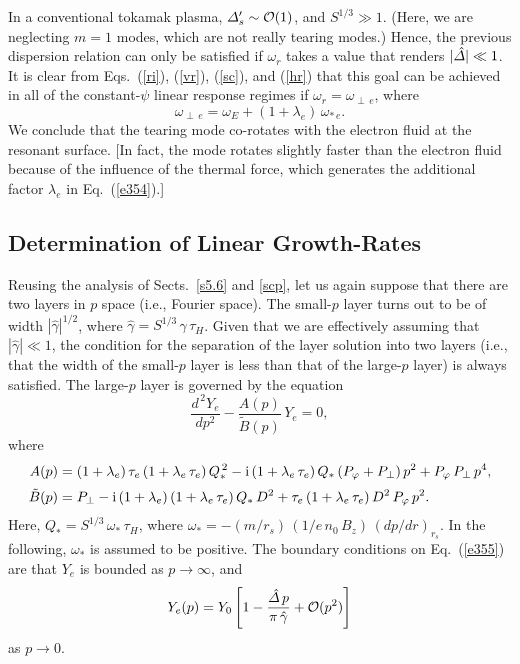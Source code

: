 \documentclass[12pt,prb,aps]{revtex4-1}
\begin{document}
In a conventional tokamak plasma, ${\mit\Delta}_s' \sim {\cal O}(1)$, and $S^{1/3}\gg 1$. (Here, we are neglecting $m=1$ modes, which
are not really tearing modes.)
Hence, the previous dispersion relation can only be satisfied if $\omega_r$ takes a
value that renders $|\hat{\mit\Delta}|\ll 1$. It is clear from Eqs.~(\ref{ri}), (\ref{vr}), (\ref{sc}), and (\ref{hr}) that this goal
can be achieved in all of the constant-$\psi$ linear response regimes if
$\omega_r = \omega_{\perp\,e}$, where
\begin{equation}\label{e354}
\omega_{\perp\,e} = \omega_E+(1+\lambda_e)\,\omega_{\ast\,e}.
\end{equation}
We conclude that the tearing mode co-rotates with the electron fluid at the resonant
 surface.\cite{ara} [In fact, the mode 
rotates slightly faster than the electron fluid because of the influence of the thermal force, 
which generates the additional  factor $\lambda_e$ in Eq.~(\ref{e354}).]

\subsection{Determination of Linear Growth-Rates}\label{s6.3}
Reusing the analysis of Sects.~\ref{s5.6} and \ref{scp}, let us again suppose that there are two layers in $p$ space (i.e., Fourier space). The
small-$p$ layer turns out to be of width $|\hat{\gamma}|^{1/2}$, where $\hat{\gamma} = S^{1/3}\,\gamma\,\tau_H$. Given that we are effectively assuming that
$|\hat{\gamma}|\ll 1$, the condition for the separation of the layer solution into two layers (i.e., that the width of the small-$p$ layer is less than that of the large-$p$ layer) is always satisfied. The large-$p$ layer is governed by the equation
\begin{equation}\label{e355}
\frac{d^{\,2} Y_e}{dp^2} - \frac{A(p)}{\tilde{B}(p)} \,Y_e =0,
\end{equation}
where 
\begin{align}
A(p) &= (1+\lambda_e)\,\tau_e\left(1+ \lambda_e\,\tau_e\right)Q_\ast^{\,2}
-{\rm i}\left(1+\lambda_e\,\tau_e\right)Q_\ast\,(P_\varphi+P_\perp)\,p^2+ P_\varphi\,P_\perp\,p^4,\\[0.5ex]
\tilde{B}(p)&= P_\perp - {\rm i}\,(1+\lambda_e)\left(1+\lambda_e\,\tau_e\right)Q_\ast\,D^2 +\tau_e\left(1+\lambda_e\,\tau_e\right) D^2\,P_\varphi\,p^2.
\end{align}
Here, $Q_\ast = S^{1/3}\,\omega_\ast\,\tau_H$, where
$\omega_\ast =-(m/r_s)\,(1/e\,n_0\,B_z)\,(dp/dr)_{r_s}$.
In the following, $\omega_\ast$ is assumed to be positive. The boundary conditions on Eq.~(\ref{e355}) are
that $Y_e$ is bounded as $p\rightarrow\infty$, and
\begin{equation}\label{e359}
Y_e(p)= Y_0\left[1-\frac{\hat{\mit\Delta}\,p}{\pi\,\hat{\gamma}} + {\cal O}(p^2)\right]
\end{equation}
as $p\rightarrow 0$. 
\end{document}
